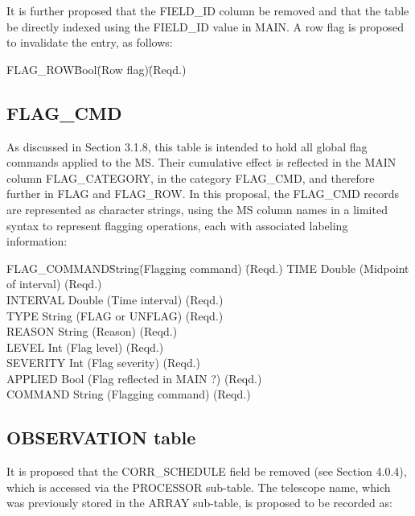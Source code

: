 \documentclass{article}
\begin{document}
It is further proposed that the FIELD\_ID column be removed and that
the table be directly indexed using the FIELD\_ID value in MAIN. A
row flag is proposed to invalidate the entry, as follows:

\begin{tabbing}
FLAG\_ROW\quad\quad  \= Bool\quad\quad \= (Row flag)\quad\quad \= (Reqd.)\\
\end{tabbing}

\subsection{FLAG\_CMD}

As discussed in Section 3.1.8, this table is intended to hold all
global flag commands applied to the MS. Their cumulative effect is
reflected in the MAIN column FLAG\_CATEGORY, in the category FLAG\_CMD,
and therefore further in FLAG and FLAG\_ROW. In this proposal, the
FLAG\_CMD records are represented as character strings, using the MS
column names in a limited syntax to represent flagging operations,
each with associated labeling information:

\begin{tabbing} 
FLAG\_COMMAND\quad\quad\quad\quad \= String\quad\quad \= (Flagging command)
\quad\quad\quad\quad \= (Reqd.) \kill
TIME \> Double \> (Midpoint of interval) \> (Reqd.) \\
INTERVAL \> Double \> (Time interval) \> (Reqd.) \\
TYPE \> String \> (FLAG or UNFLAG) \> (Reqd.) \\
REASON \> String \> (Reason) \> (Reqd.) \\
LEVEL  \> Int    \> (Flag level) \> (Reqd.) \\
SEVERITY \> Int \> (Flag severity) \> (Reqd.) \\
APPLIED \> Bool \> (Flag reflected in MAIN ?) \> (Reqd.) \\
COMMAND \> String \> (Flagging command) \> (Reqd.) \\
\end{tabbing}

\subsection{OBSERVATION table}

It is proposed that the CORR\_SCHEDULE field be removed (see Section
4.0.4), which is accessed via the PROCESSOR sub-table. The telescope
name, which was previously stored in the ARRAY sub-table, is proposed
to be recorded as:
\end{document}
